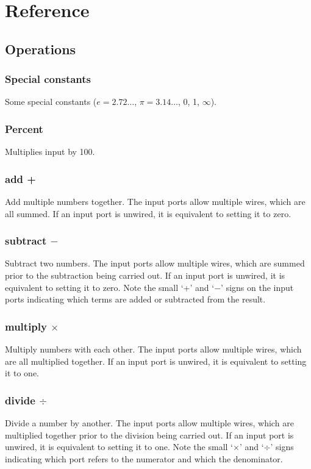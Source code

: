 \chapter{Reference}

\section{Operations}\label{Operations}

\subsection{Special
  constants}\label{Operation:euler}\label{Operation:pi}\label{Operation:zero}\label{Operation:one}
\label{Operation:inf}

Some special constants ($e=2.72\ldots$, $\pi=3.14\ldots$, 0, 1,
$\infty$).

\subsection{Percent} \label{Operation:percent} Multiplies input by
100.

\subsection{add +}\label{Operation:add} Add multiple numbers together. The input
ports allow multiple wires, which are all summed. If an input port is
unwired, it is equivalent to setting it to zero.

\subsection{subtract $-$}\label{Operation:subtract} Subtract two numbers. The input
ports allow multiple wires, which are summed prior to the subtraction
being carried out. If an input port is unwired, it is equivalent to
setting it to zero. Note the small `+' and `$-$' signs on the input
ports indicating which terms are added or subtracted from the result.

\subsection{multiply $\times$}\label{Operation:multiply} Multiply numbers with each
other. The input ports allow multiple wires, which are all multiplied
together. If an input port is unwired, it is equivalent to setting it
to one.

\subsection{divide $\div$}\label{Operation:divide} Divide a number by another. The
input ports allow multiple wires, which are multiplied together prior
to the division being carried out. If an input port is unwired, it is
equivalent to setting it to one. Note the small `$\times$' and
`$\div$' signs indicating which port refers to the numerator and which
the denominator.

